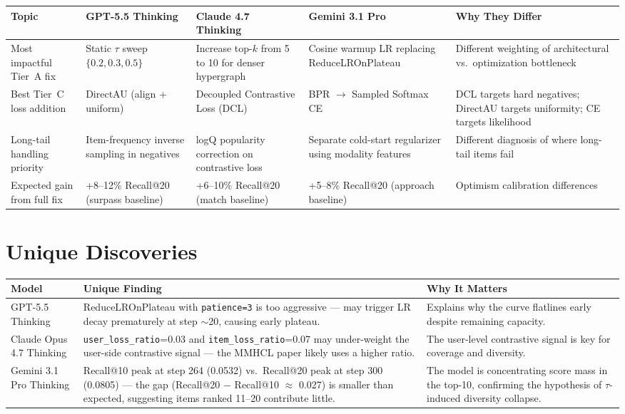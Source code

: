 \documentclass[11pt,a4paper]{article}
\begin{document}
\begin{longtable}{|p{3.2cm}|p{3cm}|p{3cm}|p{3cm}|p{3.2cm}|}
\hline
\textbf{Topic} & \textbf{GPT-5.5 Thinking} & \textbf{Claude 4.7 Thinking} & \textbf{Gemini 3.1 Pro} & \textbf{Why They Differ} \\
\hline
\endhead
\hline
\endfoot
Most impactful Tier~A fix & Static $\tau$ sweep $\{0.2, 0.3, 0.5\}$ & Increase top-$k$ from 5 to 10 for denser hypergraph & Cosine warmup LR replacing ReduceLROnPlateau & Different weighting of architectural vs.\ optimization bottleneck \\
\hline
Best Tier~C loss addition & DirectAU (align + uniform) & Decoupled Contrastive Loss (DCL) & BPR $\to$ Sampled Softmax CE & DCL targets hard negatives; DirectAU targets uniformity; CE targets likelihood \\
\hline
Long-tail handling priority & Item-frequency inverse sampling in negatives & logQ popularity correction on contrastive loss & Separate cold-start regularizer using modality features & Different diagnosis of where long-tail items fail \\
\hline
Expected gain from full fix & +8--12\% Recall@20 (surpass baseline) & +6--10\% Recall@20 (match baseline) & +5--8\% Recall@20 (approach baseline) & Optimism calibration differences \\
\hline
\end{longtable}

\section{Unique Discoveries}

\begin{longtable}{|p{3cm}|p{6.5cm}|p{6cm}|}
\hline
\textbf{Model} & \textbf{Unique Finding} & \textbf{Why It Matters} \\
\hline
\endhead
\hline
\endfoot
GPT-5.5 Thinking & ReduceLROnPlateau with \texttt{patience=3} is too aggressive --- may trigger LR decay prematurely at step $\sim$20, causing early plateau. & Explains why the curve flatlines early despite remaining capacity. \\
\hline
Claude Opus 4.7 Thinking & \texttt{user\_loss\_ratio}=0.03 and \texttt{item\_loss\_ratio}=0.07 may under-weight the user-side contrastive signal --- the MMHCL paper likely uses a higher ratio. & The user-level contrastive signal is key for coverage and diversity. \\
\hline
Gemini 3.1 Pro Thinking & Recall@10 peak at step 264 (0.0532) vs.\ Recall@20 peak at step 300 (0.0805) --- the gap (Recall@20 $-$ Recall@10 $\approx$ 0.027) is smaller than expected, suggesting items ranked 11--20 contribute little. & The model is concentrating score mass in the top-10, confirming the hypothesis of $\tau$-induced diversity collapse. \\
\hline
\end{longtable}
\end{document}
